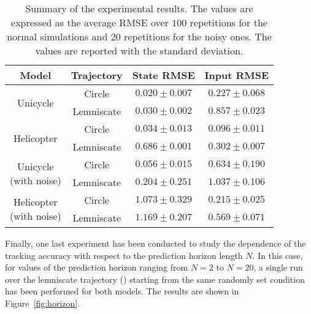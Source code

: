 \documentclass[../main.tex]{subfiles}
\begin{document}
\begin{table}[htb]
  \renewcommand{\arraystretch}{1.3} %
  \centering
  \begin{tabular}{|c|c|c|c|}

    \hline
    \rowcolor{boxcolor}
	\textbf{Model} & \textbf{Trajectory} & \textbf{State RMSE} & \textbf{Input
	RMSE} \\

	\hline
	\multirow{2}{*}{Unicycle} & Circle & $0.020 \pm 0.007$ & $0.227 \pm 0.068$ \\
	\cline{2-4}
	& Lemniscate & $0.030 \pm 0.002$ & $0.857 \pm 0.023$ \\
	\hline

	\multirow{2}{*}{Helicopter} & Circle & $0.034 \pm 0.013$ & $0.096 \pm 0.011$ \\
	\cline{2-4}
	& Lemniscate & $0.686 \pm 0.001$ & $0.302 \pm 0.007$ \\
	\hline

	\multirow{2}{*}{\parbox{2cm}{Unicycle\\(with noise)}} & Circle & $0.056 \pm
	0.015$ & $0.634 \pm 0.190$ \\
	\cline{2-4}
	& Lemniscate & $0.204 \pm 0.251$ & $1.037 \pm 0.106$ \\
	\hline

	\multirow{2}{*}{\parbox{2cm}{Helicopter\\(with noise)}} & Circle & $1.073
	\pm 0.329$ & $0.215 \pm 0.025$ \\
	\cline{2-4}
			   & Lemniscate & $1.169 \pm 0.207$ & $0.569 \pm 0.071$ \\
	\hline

  \end{tabular}
  \caption{Summary of the experimental results. The values are expressed as the
	  average RMSE over $100$ repetitions for the normal simulations and $20$
	  repetitions for the noisy ones. The values are reported with the
	  standard deviation.}\label{tab:results}
  \renewcommand{\arraystretch}{1} %
\end{table}

Finally, one last experiment has been conducted to study the dependence of the
tracking accuracy with respect to the prediction horizon length $N$. In this
case, for values of the prediction horizon ranging from $N = 2$ to $N = 20$, a
single run over the lemniscate trajectory ()
starting from the same randomly set condition has been
performed for both models. The results are shown in Figure~\ref{fig:horizon}.
\end{document}
